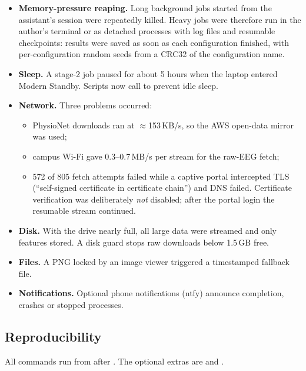 \begin{itemize}
\item \textbf{Memory-pressure reaping.} Long background jobs started from the assistant's session were repeatedly killed. Heavy jobs were therefore run in the author's terminal or as detached processes with log files and resumable checkpoints: results were saved as soon as each configuration finished, with per-configuration random seeds from a CRC32 of the configuration name.
\item \textbf{Sleep.} A stage-2 job paused for about 5 hours when the laptop entered Modern Standby. Scripts now call  to prevent idle sleep.
\item \textbf{Network.} Three problems occurred:
\begin{itemize}
\item PhysioNet downloads ran at $\approx$153\,KB/s, so the AWS open-data mirror was used;
\item campus Wi-Fi gave 0.3--0.7\,MB/s per stream for the raw-EEG fetch;
\item 572 of 805 fetch attempts failed while a captive portal intercepted TLS (``self-signed certificate in certificate chain'') and DNS failed. Certificate verification was deliberately \emph{not} disabled; after the portal login the resumable stream continued.
\end{itemize}
\item \textbf{Disk.} With the drive nearly full, all large data were streamed and only features stored. A disk guard stops raw downloads below 1.5\,GB free.
\item \textbf{Files.} A PNG locked by an image viewer triggered a timestamped fallback file.
\item \textbf{Notifications.} Optional phone notifications (ntfy) announce completion, crashes or stopped processes.
\end{itemize}

\subsection{Reproducibility}

All commands run from  after . The optional extras are  and .

